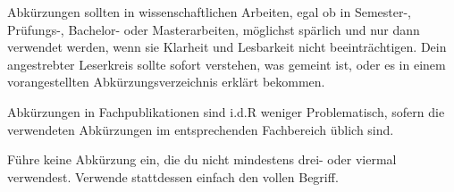 Abkürzungen sollten in wissenschaftlichen Arbeiten, egal ob in Semester-, Prüfungs-, Bachelor- oder Masterarbeiten, möglichst spärlich und nur dann verwendet werden, wenn sie Klarheit und Lesbarkeit nicht beeinträchtigen. Dein angestrebter Leserkreis sollte sofort verstehen, was gemeint ist, oder es in einem vorangestellten Abkürzungsverzeichnis erklärt bekommen. 

Abkürzungen in Fachpublikationen sind i.d.R weniger Problematisch, sofern die verwendeten Abkürzungen im entsprechenden Fachbereich üblich sind.

Führe keine Abkürzung ein, die du nicht mindestens drei- oder viermal verwendest. Verwende stattdessen einfach den vollen Begriff.



